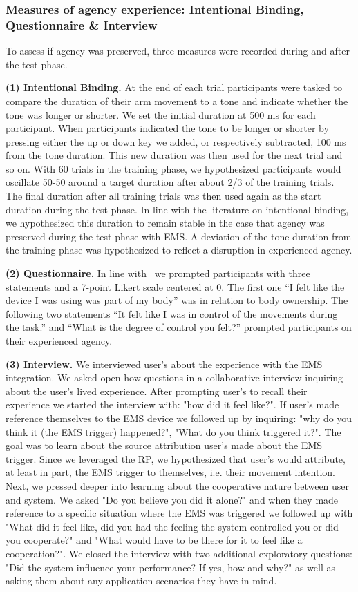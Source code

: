 \subsubsection{Measures of agency experience: Intentional Binding, Questionnaire \& Interview}

To assess if agency was preserved, three measures were recorded during and after the test phase.

\indent\textbf{(1) Intentional Binding.}
At the end of each trial participants were tasked to compare the duration of their arm movement to a tone and indicate whether the tone was longer or shorter. We set the initial duration at 500 ms for each participant. When participants indicated the tone to be longer or shorter by pressing either the up or down key we added, or respectively subtracted, 100 ms from the tone duration. This new duration was then used for the next trial and so on. With 60 trials in the training phase, we hypothesized participants would oscillate 50-50 around a target duration after about 2/3 of the training trials. The final duration after all training trials was then used again as the start duration during the test phase. In line with the literature on intentional binding, we hypothesized this duration to remain stable in the case that agency was preserved during the test phase with EMS. A deviation of the tone duration from the training phase was hypothesized to reflect a disruption in experienced agency.

\indent\textbf{(2) Questionnaire.}
In line with~\cite{Hornbaek} we prompted participants with three statements and a 7-point Likert scale centered at 0. The first one ``I felt like the device I was using was part of my body'' was in relation to body ownership. The following two statements ``It felt like I was in control of the movements during the task.'' and ``What is the degree of control you felt?'' prompted participants on their experienced agency.

\indent\textbf{(3) Interview.}
We interviewed user's about the experience with the EMS integration. We asked open how questions in a collaborative interview inquiring about the user's lived experience. After prompting user's to recall their experience we started the interview with: "how did it feel like?". If user's made reference themselves to the EMS device we followed up by inquiring: "why do you think it (the EMS trigger) happened?", "What do you think triggered it?". The goal was to learn about the source attribution user's made about the EMS trigger. Since we leveraged the RP, we hypothesized that user's would attribute, at least in part, the EMS trigger to themselves, i.e. their movement intention. Next, we pressed deeper into learning about the cooperative nature between user and system. We asked "Do you believe you did it alone?" and when they made reference to a specific situation where the EMS was triggered we followed up with "What did it feel like, did you had the feeling the system controlled you or did you cooperate?" and "What would have to be there for it to feel like a cooperation?". We closed the interview with two additional exploratory questions: "Did the system influence your performance? If yes, how and why?" as well as asking them about any application scenarios they have in mind. 

